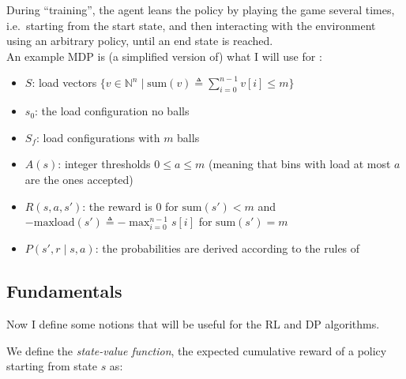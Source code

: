 During ``training'', the agent leans the policy by playing the game several times, i.e.\ starting from the start state, and then interacting with the environment using an arbitrary policy, until an end state is reached.\\

An example MDP is (a simplified version of) what I will use for \TwoThinning:

\begin{itemize}[itemsep=0pt]
    \item 
    $S$: load vectors $\{v\in \mathbb{N}^n\mid\mathrm{sum}(v)\triangleq \sum_{i=0}^{n-1}v[i]\leq m\}$
    \item
    $s_0$: the load configuration no balls
    \item
    $S_f$: load configurations with $m$ balls
    \item
    $A(s)$: integer thresholds $0\leq a\leq m$ (meaning that bins with load at most $a$ are the ones accepted)
    \item
    $R(s, a, s')$: the reward is $0$ for $\mathrm{sum}(s')<m$ and $-\mathrm{maxload}(s')\triangleq -\max_{i=0}^{n-1} s[i]$ for $\mathrm{sum}(s')=m$

    \item
    $P(s', r \mid s, a)$: the probabilities are derived according to the rules of \TwoThinning
\end{itemize}


\subsection{Fundamentals}

Now I define some notions that will be useful for the RL and DP algorithms.


We define the \textit{state-value function}, the expected cumulative reward of a policy starting from state $s$ as:

